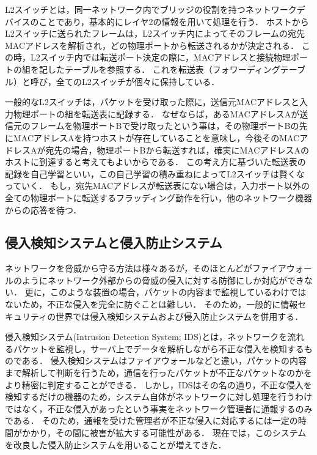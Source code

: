 L2スイッチとは，同一ネットワーク内でブリッジの役割を持つネットワークデバイスのことであり，基本的にレイヤ2の情報を用いて処理を行う\cite{masteringtcpip}．
ホストからL2スイッチに送られたフレームは，L2スイッチ内によってそのフレームの宛先MACアドレスを解析され，どの物理ポートから転送されるかが決定される．
この時，L2スイッチ内では転送ポート決定の際に，MACアドレスと接続物理ポートの組を記したテーブルを参照する．
これを転送表（フォワーディングテーブル）と呼び，全てのL2スイッチが個々に保持している．

一般的なL2スイッチは，パケットを受け取った際に，送信元MACアドレスと入力物理ポートの組を転送表に記録する．
なぜならば，あるMACアドレスAが送信元のフレームを物理ポートBで受け取ったという事は，その物理ポートBの先にMACアドレスAを持つホストが存在していることを意味し，今後そのMACアドレスAが宛先の場合，物理ポートBから転送すれば，確実にMACアドレスAのホストに到達すると考えてもよいからである．
この考え方に基づいた転送表の記録を自己学習といい，この自己学習の積み重ねによってL2スイッチは賢くなっていく．
もし，宛先MACアドレスが転送表にない場合は，入力ポート以外の全ての物理ポートに転送するフラッディング動作を行い，他のネットワーク機器からの応答を待つ．

\subsection{侵入検知システムと侵入防止システム}

ネットワークを脅威から守る方法は様々あるが，そのほとんどがファイアウォールのようにネットワーク外部からの脅威の侵入に対する防御にしか対応ができない．
更に，このような装置の場合，パケットの内容まで監視しているわけではないため，不正な侵入を完全に防ぐことは難しい．
そのため，一般的に情報セキュリティの世界では侵入検知システムおよび侵入防止システムを併用する．

侵入検知システム(Intrusion Detection System; IDS)とは，ネットワークを流れるパケットを監視し，サーバ上でデータを解析しながら不正な侵入を検知するものである\cite{idsandips}．
侵入検知システムはファイアウォールなどと違い，パケットの内容まで解析して判断を行うため，通信を行ったパケットが不正なパケットなのかをより精密に判定することができる．
しかし，IDSはその名の通り，不正な侵入を検知するだけの機器のため，システム自体がネットワークに対し処理を行うわけではなく，不正な侵入があったという事実をネットワーク管理者に通報するのみである．
そのため，通報を受けた管理者が不正な侵入に対応するには一定の時間がかかり，その間に被害が拡大する可能性がある．
現在では，このシステムを改良した侵入防止システムを用いることが増えてきた．

